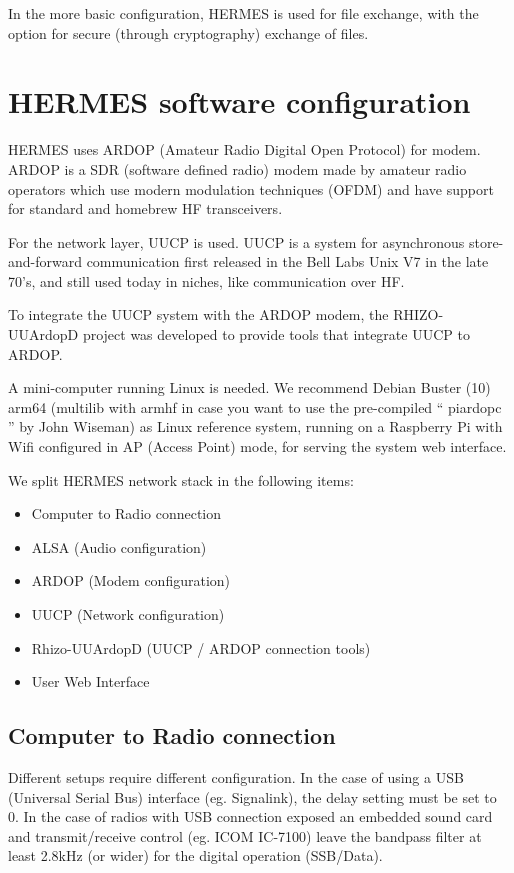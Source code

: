 \documentclass[11pt,a4paper]{article}
\begin{document}
In the more basic configuration, HERMES is used for file exchange, with the
option for secure (through cryptography) exchange of files.

\section{HERMES software configuration}

HERMES uses ARDOP (Amateur Radio Digital Open Protocol) for modem. ARDOP is
a SDR (software defined radio) modem made by amateur radio operators which
use modern modulation techniques (OFDM) and have support for standard and
homebrew HF transceivers.

For the network layer, UUCP is used. UUCP is a system for asynchronous
store-and-forward communication first released in the Bell Labs Unix V7 in
the late 70's, and still used today in niches, like communication over HF.

To integrate the UUCP system with the ARDOP modem, the RHIZO-UUArdopD
project was developed to provide tools that integrate UUCP to ARDOP.

A mini-computer running Linux is needed. We recommend Debian Buster (10)
arm64 (multilib with armhf in case you want to use the pre-compiled ``
piardopc '' by John Wiseman) as Linux reference system, running on a Raspberry Pi with
Wifi configured in AP (Access Point) mode, for serving the system web
interface.

We split HERMES network stack in the following items:
\begin{itemize}
\item Computer to Radio connection
\item ALSA (Audio configuration)
\item ARDOP (Modem configuration)
\item UUCP (Network configuration)
\item Rhizo-UUArdopD (UUCP / ARDOP connection tools)
\item User Web Interface
\end{itemize}

\subsection{Computer to Radio connection}

Different setups require different configuration. In the case of using a USB
(Universal Serial Bus) interface (eg. Signalink), the delay setting must be
set to 0. In the case of radios with USB connection exposed an embedded sound
card and transmit/receive control (eg. ICOM IC-7100) leave the bandpass
filter at least 2.8kHz (or wider) for the digital operation (SSB/Data).
\end{document}
